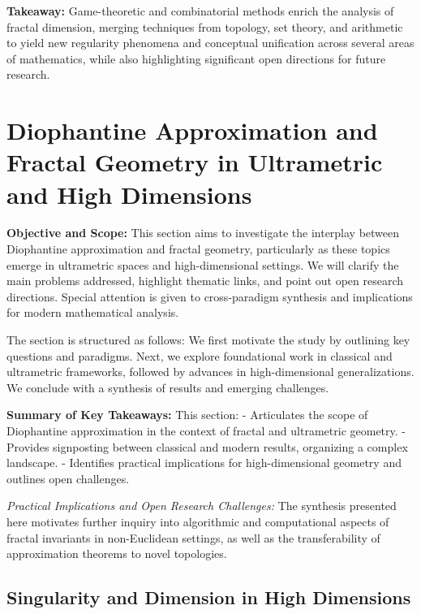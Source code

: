 \documentclass[sigconf]{acmart}
\begin{document}
\textbf{Takeaway:} Game-theoretic and combinatorial methods enrich the analysis of fractal dimension, merging techniques from topology, set theory, and arithmetic to yield new regularity phenomena and conceptual unification across several areas of mathematics, while also highlighting significant open directions for future research.

\section{Diophantine Approximation and Fractal Geometry in Ultrametric and High Dimensions}

\textbf{Objective and Scope:} This section aims to investigate the interplay between Diophantine approximation and fractal geometry, particularly as these topics emerge in ultrametric spaces and high-dimensional settings. We will clarify the main problems addressed, highlight thematic links, and point out open research directions. Special attention is given to cross-paradigm synthesis and implications for modern mathematical analysis.

The section is structured as follows: We first motivate the study by outlining key questions and paradigms. Next, we explore foundational work in classical and ultrametric frameworks, followed by advances in high-dimensional generalizations. We conclude with a synthesis of results and emerging challenges.

\textbf{Summary of Key Takeaways:} This section:
- Articulates the scope of Diophantine approximation in the context of fractal and ultrametric geometry.
- Provides signposting between classical and modern results, organizing a complex landscape.
- Identifies practical implications for high-dimensional geometry and outlines open challenges.

\textit{Practical Implications and Open Research Challenges:} The synthesis presented here motivates further inquiry into algorithmic and computational aspects of fractal invariants in non-Euclidean settings, as well as the transferability of approximation theorems to novel topologies.


\subsection{Singularity and Dimension in High Dimensions}
\end{document}

